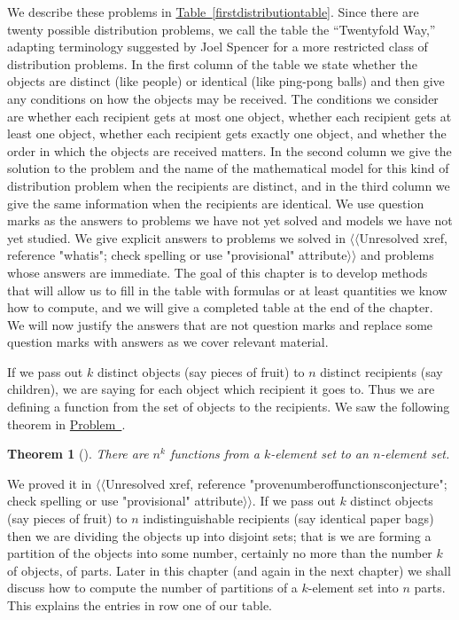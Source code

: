 \documentclass[10pt,]{book}
\theoremstyle{plain}
\newtheorem{theorem}{Theorem}[section]
\theoremstyle{definition}
\numberwithin{equation}{chapter}
\begin{document}
We describe these problems in \hyperref[firstdistributiontable]{Table~\ref{firstdistributiontable}}. Since there are twenty possible distribution problems, we call the table the ``Twentyfold Way,'' adapting terminology suggested by Joel Spencer for a more restricted class of distribution problems. In the first column of the table we state whether the objects are distinct (like people) or identical (like ping-pong balls) and then give any conditions on how the objects may be received. The conditions we consider are whether each recipient gets at most one object, whether each recipient gets at least one object, whether each recipient gets exactly one object, and whether the order in which the objects are received matters. In the second column we give the solution to the problem and the name of the mathematical model for this kind of distribution problem when the recipients are distinct, and in the third column we give the same information when the recipients are identical. We use question marks as the answers to problems we have not yet solved and models we have not yet studied. We give explicit answers to problems we solved in {$\langle\langle$Unresolved xref, reference "whatis"; check spelling or use "provisional" attribute$\rangle\rangle$} and problems whose answers are immediate. The goal of this chapter is to develop methods that will allow us to fill in the table with formulas or at least quantities we know how to compute, and we will give a completed table at the end of the chapter. We will now justify the answers that are not question marks and replace some question marks with answers as we cover relevant material.%
\par
If we pass out \(k\) distinct objects (say pieces of fruit) to \(n\) distinct recipients (say children), we are saying for each object which recipient it goes to. Thus we are defining a function from the set of objects to the recipients. We saw the following theorem in \hyperref[numberoffunctionsconjecture]{Problem~}.%
\begin{theorem}[{}]\label{theorem-3}
There are \(n^k\) functions from a \(k\)-element set to an \(n\)-element set.%
\end{theorem}
We proved it in {$\langle\langle$Unresolved xref, reference "provenumberoffunctionsconjecture"; check spelling or use "provisional" attribute$\rangle\rangle$}. If we pass out \(k\) distinct objects (say pieces of fruit) to \(n\) indistinguishable recipients (say identical paper bags) then we are dividing the objects up into disjoint sets; that is we are forming a partition of the objects into some number, certainly no more than the number \(k\) of objects, of parts. Later in this chapter (and again in the next chapter) we shall discuss how to compute the number of partitions of a \(k\)-element set into \(n\) parts. This explains the entries in row one of our table.%
\end{document}
